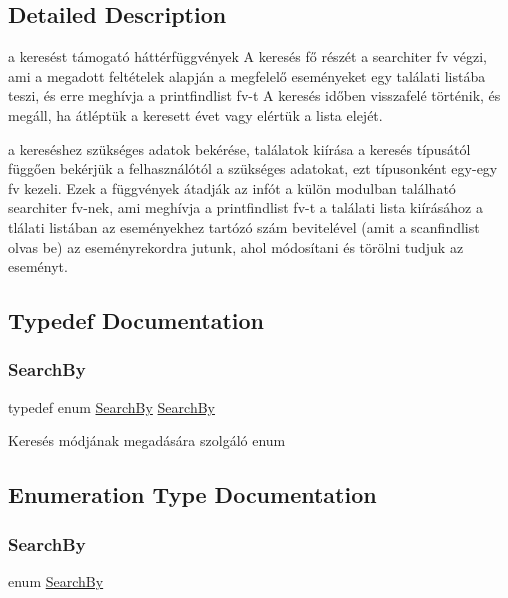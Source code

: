\subsection{Detailed Description}
a keresést támogató háttérfüggvények A keresés fő részét a searchiter fv végzi, ami a megadott feltételek alapján a megfelelő eseményeket egy találati listába teszi, és erre meghívja a printfindlist fv-\/t A keresés időben visszafelé történik, és megáll, ha átléptük a keresett évet vagy elértük a lista elejét. 

a kereséshez szükséges adatok bekérése, találatok kiírása a keresés típusától függően bekérjük a felhasználótól a szükséges adatokat, ezt típusonként egy-\/egy fv kezeli. Ezek a függvények átadják az infót a külön modulban található searchiter fv-\/nek, ami meghívja a printfindlist fv-\/t a találati lista kiírásához a tlálati listában az eseményekhez tartózó szám bevitelével (amit a scanfindlist olvas be) az eseményrekordra jutunk, ahol módosítani és törölni tudjuk az eseményt.

\subsection{Typedef Documentation}
\mbox{\label{group__search_ga2ab4e565bcf990b57e010007e13bec43}} 
\subsubsection{\texorpdfstring{Search\+By}{SearchBy}}
{\footnotesize\ttfamily typedef enum \hyperlink{group__search_gaf9df49b17c9441844cafc15064ec50fc}{Search\+By} \hyperlink{group__search_gaf9df49b17c9441844cafc15064ec50fc}{Search\+By}}

Keresés módjának megadására szolgáló enum 

\subsection{Enumeration Type Documentation}
\mbox{\label{group__search_gaf9df49b17c9441844cafc15064ec50fc}} 
\subsubsection{\texorpdfstring{Search\+By}{SearchBy}}
{\footnotesize\ttfamily enum \hyperlink{group__search_gaf9df49b17c9441844cafc15064ec50fc}{Search\+By}}

